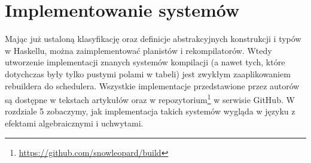 \section{Implementowanie systemów}

Mając już ustaloną klasyfikację oraz definicje abstrakcyjnych konstrukcji i typów w Haskellu, można zaimplementować planistów i rekompilatorów. Wtedy utworzenie implementacji znanych systemów kompilacji (a nawet tych, które dotychczas były tylko pustymi polami w tabeli) jest zwykłym zaaplikowaniem rebuildera do schedulera. Wszystkie implementacje przedstawione przez autorów \BSaLC{} są dostępne w tekstach artykułów \cite{mokhov2018build, mokhov2020build} oraz w repozytorium\footnote{\url{https://github.com/snowleopard/build}} w serwisie GitHub. W rozdziale 5 zobaczymy, jak implementacja takich systemów wygląda w języku z efektami algebraicznymi i uchwytami.

\undef\inl
